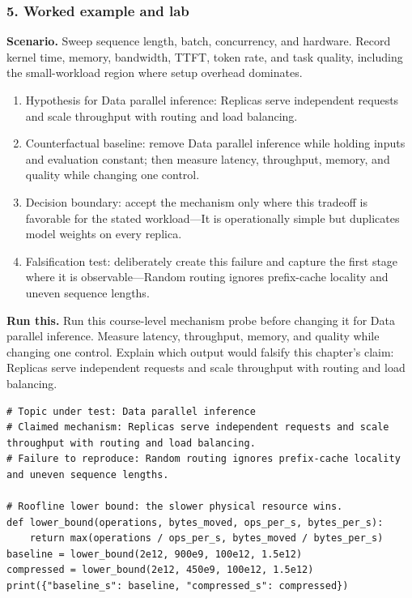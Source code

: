 \subsubsection*{5. Worked example and lab}
\textbf{Scenario.} Sweep sequence length, batch, concurrency, and hardware. Record kernel time, memory, bandwidth, TTFT, token rate, and task quality, including the small-workload region where setup overhead dominates.
\begin{enumerate}
\item Hypothesis for Data parallel inference: Replicas serve independent requests and scale throughput with routing and load balancing.
\item Counterfactual baseline: remove Data parallel inference while holding inputs and evaluation constant; then measure latency, throughput, memory, and quality while changing one control.
\item Decision boundary: accept the mechanism only where this tradeoff is favorable for the stated workload—It is operationally simple but duplicates model weights on every replica.
\item Falsification test: deliberately create this failure and capture the first stage where it is observable—Random routing ignores prefix-cache locality and uneven sequence lengths.
\end{enumerate}
\textbf{Run this.} Run this course-level mechanism probe before changing it for Data parallel inference. Measure latency, throughput, memory, and quality while changing one control. Explain which output would falsify this chapter's claim: Replicas serve independent requests and scale throughput with routing and load balancing.
\begin{Verbatim}[fontsize=\scriptsize]
# Topic under test: Data parallel inference
# Claimed mechanism: Replicas serve independent requests and scale throughput with routing and load balancing.
# Failure to reproduce: Random routing ignores prefix-cache locality and uneven sequence lengths.

# Roofline lower bound: the slower physical resource wins.
def lower_bound(operations, bytes_moved, ops_per_s, bytes_per_s):
    return max(operations / ops_per_s, bytes_moved / bytes_per_s)
baseline = lower_bound(2e12, 900e9, 100e12, 1.5e12)
compressed = lower_bound(2e12, 450e9, 100e12, 1.5e12)
print({"baseline_s": baseline, "compressed_s": compressed})
\end{Verbatim}
